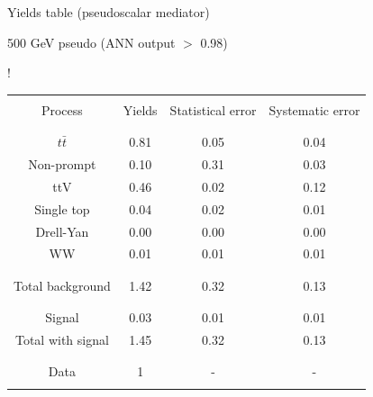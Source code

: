 \documentclass[8 pt]{beamer}
\begin{document}
\begin{frame}{Yields table (pseudoscalar mediator)}
\begin{minipage}[c]{.48\linewidth}
\begin{center}
	\end{center}

	\end{minipage} \hfill
	\begin{minipage}[c]{.48\linewidth}
	
	\begin{exampleblock}{}{ \begin{center} 500 GeV pseudo (ANN output $>$ 0.98) \end{center}} \end{exampleblock} \vspace{8pt}
	
	\resizebox{170pt} {!}{
	\begin{tabular}{c|c|c|c}
	 	& & & \\
		Process & Yields & Statistical error & Systematic error \\
		& & & \\
		\hline \hline
		& & & \\
		$t \bar t$ & 0.81 & 0.05 & 0.04 \\
		Non-prompt & 0.10 & 0.31 & 0.03 \\
		ttV & 0.46 & 0.02 & 0.12 \\
		Single top & 0.04 & 0.02 & 0.01 \\
		Drell-Yan & 0.00 & 0.00 & 0.00 \\
		WW & 0.01 & 0.01 & 0.01 \\
		& & & \\
		\hline
		& & & \\
		Total background & 1.42 & 0.32  & 0.13 \\
		& & & \\
		\hline
		& & & \\
		Signal & 0.03 & 0.01 & 0.01 \\
		Total with signal & 1.45 & 0.32 & 0.13 \\
		& & & \\
		\hline
		& & & \\
		Data & 1 & - & - \\
		& & & \\
	\end{tabular}
	} 
	
	\end{minipage} \hfill \vfill

\end{frame}
\end{document}
